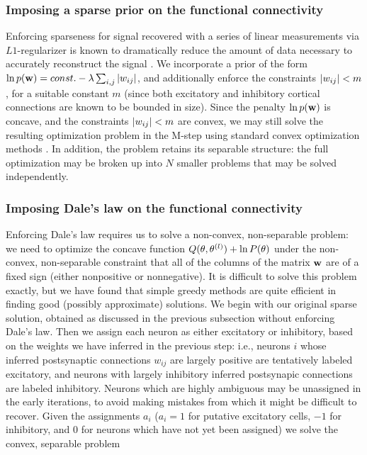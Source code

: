 \subsubsection{Imposing a sparse prior on the functional connectivity}

Enforcing sparseness for signal recovered with a series of linear
measurements via $L1$-regularizer is known to dramatically reduce the
amount of data necessary to accurately reconstruct the signal
\cite{Tibs96,TIP01,DE03,NG04,Candes2005,Mishchenko2009}.  We
incorporate a prior of the form $\ln p(\mathbf{w}) = const. - \lambda
\sum_{i,j} |w_{ij}|$, and additionally enforce the constraints
$|w_{ij}|<m$, for a suitable constant $m$ (since both excitatory and
inhibitory cortical connections are known to be bounded in size).
Since the penalty $\ln p(\mathbf{w})$ is concave, and the constraints
$|w_{ij}|<m$ are convex, we may still solve the resulting
optimization problem in the M-step using standard convex optimization
methods \cite{CONV04}.  In addition, the problem retains its separable
structure: the full optimization may be broken up into $N$ smaller
problems that may be solved independently.

\subsubsection{Imposing Dale's law on the functional connectivity}

Enforcing Dale's law requires us to solve a non-convex, non-separable problem: we need to optimize the concave function $Q(\mathbf{\theta},\mathbf{\theta}^{(l)}) + \ln P(\theta)$ under the non-convex, non-separable constraint that all of the columns of the matrix $\mathbf{w}$ are of a fixed sign (either nonpositive or nonnegative). It is difficult to solve this problem exactly, but we have found that simple greedy methods are quite efficient in finding good (possibly approximate) solutions. We begin with our original sparse solution, obtained as discussed in the previous subsection without enforcing Dale's law. Then we assign each neuron as either excitatory or inhibitory, based on the weights we have inferred in the previous step: i.e., neurons $i$ whose inferred postsynaptic connections $w_{ij}$ are largely positive are tentatively labeled excitatory, and neurons with largely inhibitory inferred postsynapic connections are labeled inhibitory. Neurons which are highly ambiguous may be unassigned in the early iterations, to avoid making mistakes from which it might be difficult to recover. Given the assignments $a_i$ ($a_i =1$ for putative excitatory cells, $-1$ for inhibitory, and $0$ for neurons which have not yet been assigned) we solve the convex, separable problem

